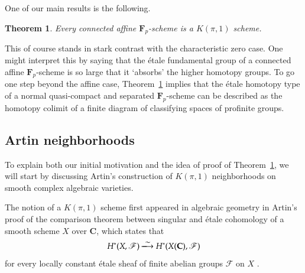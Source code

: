 \documentclass[twoside]{amsart}
\newcommand{\CC}{\mathbf{C}}
\newcommand{\FF}{\mathbf{F}}
\newcommand{\Ff}{\mathscr{F}}
\newcommand*\isomlong{%
 		\xlongrightarrow{\raisebox{-0.2 em}{\smash{\ensuremath{\sim}}}}%
	}
\theoremstyle{plain}
\newtheorem{theorem}[subsubsection]{Theorem}
\theoremstyle{definition}
\theoremstyle{remark}
\numberwithin{equation}{subsection}
\begin{document}
One of our main results is the following.

\begin{theorem} \label{thm:affine-kpi1}
	Every connected affine $\FF_p$-scheme is a $K(\pi, 1)$ scheme.
\end{theorem}

This of course stands in stark contrast with the characteristic zero case. One might interpret this by saying that the \'etale fundamental group of a connected affine $\FF_p$-scheme is so large that it `absorbs' the higher homotopy groups. To go one step beyond the affine case, Theorem~\ref{thm:affine-kpi1} implies that the \'etale homotopy type of a normal quasi-compact and separated $\FF_p$-scheme can be described as the homotopy colimit of a finite diagram of classifying spaces of profinite groups.

\subsection{Artin neighborhoods}
\label{ss:artin}

To explain both our initial motivation and the idea of proof of Theorem~\ref{thm:affine-kpi1}, we will start by discussing Artin's construction of $K(\pi, 1)$ neighborhoods on smooth complex algebraic varieties. 

The notion of a $K(\pi, 1)$ scheme first appeared in algebraic geometry in Artin's proof of the comparison theorem between singular and \'etale cohomology of a smooth scheme $X$ over $\CC$, which states that
\begin{equation} \label{eqn:etale-singular}
	H^*(X, \Ff) \isomlong H^*(X(\CC), \Ff)
\end{equation}
for every locally constant \'etale sheaf of finite abelian groups $\Ff$ on $X$ \cite[Exp.~XI]{Artin}.
\end{document}
